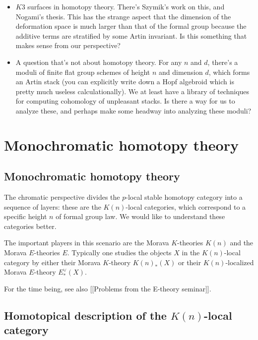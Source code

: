 \documentclass[12pt,titlepage]{article}
\theoremstyle{plain}
\theoremstyle{definition}
\theoremstyle{remark}
\begin{document}
\begin{itemize}
\item $K3$ surfaces in homotopy theory. There'{}s Szymik'{}s work on this, and Nogami'{}s thesis. This has the strange aspect that the dimension of the deformation space is much larger than that of the formal group because the additive terms are stratified by some Artin invariant. Is this something that makes sense from our perspective?


\item A question that'{}s not about homotopy theory. For any $n$ and $d$, there'{}s a moduli of finite flat group schemes of height $n$ and dimension $d$, which forms an Artin stack (you can explicitly write down a Hopf algebroid which is pretty much useless calculationally). We at least have a library of techniques for computing cohomology of unpleasant stacks. Is there a way for us to analyze these, and perhaps make some headway into analyzing these moduli?



\end{itemize}
\section{Monochromatic homotopy theory}

\hypertarget{monochromatic_homotopy_theory_1}{}\subsection{{Monochromatic homotopy theory}}\label{monochromatic_homotopy_theory_1}

The chromatic perspective divides the $p$-local stable homotopy category into a sequence of layers: these are the $K(n)$-local categories, which correspond to a specific height $n$ of formal group law. We would like to understand these categories better.

The important players in this scenario are the Morava $K$-theories $K(n)$ and the Morava $E$-theories $E$. Typically one studies the objects $X$ in the $K(n)$-local category by either their Morava $K$-theory $K(n)_*(X)$ or their $K(n)$-localized Morava $E$-theory $E^\vee_*(X)$.

For the time being, see also [[Problems from the E-theory seminar]].

\hypertarget{homotopical_description_of_the_local_category_2}{}\subsection{{Homotopical description of the $K(n)$-local category}}\label{homotopical_description_of_the_local_category_2}
\end{document}
